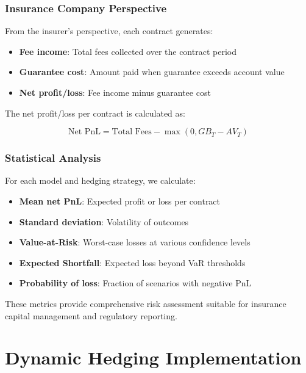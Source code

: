 \documentclass[12pt,a4paper]{report}
\begin{document}
\subsection{Insurance Company Perspective}

From the insurer's perspective, each contract generates:

\begin{itemize}
\item \textbf{Fee income}: Total fees collected over the contract period
\item \textbf{Guarantee cost}: Amount paid when guarantee exceeds account value
\item \textbf{Net profit/loss}: Fee income minus guarantee cost
\end{itemize}

The net profit/loss per contract is calculated as:

\begin{equation}
\text{Net PnL} = \text{Total Fees} - \max(0, GB_T - AV_T)
\end{equation}

\subsection{Statistical Analysis}

For each model and hedging strategy, we calculate:

\begin{itemize}
\item \textbf{Mean net PnL}: Expected profit or loss per contract
\item \textbf{Standard deviation}: Volatility of outcomes  
\item \textbf{Value-at-Risk}: Worst-case losses at various confidence levels
\item \textbf{Expected Shortfall}: Expected loss beyond VaR thresholds
\item \textbf{Probability of loss}: Fraction of scenarios with negative PnL
\end{itemize}

These metrics provide comprehensive risk assessment suitable for insurance capital management and regulatory reporting.

\chapter{Dynamic Hedging Implementation}
\end{document}
